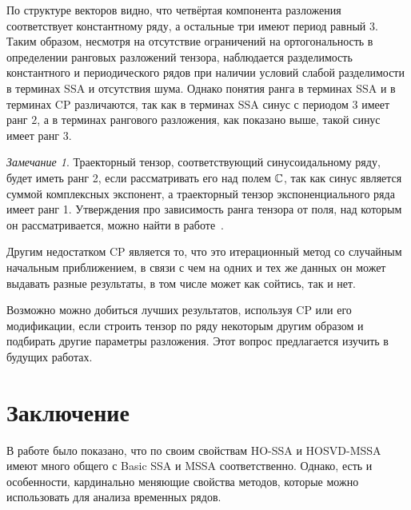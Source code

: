 \documentclass[specialist,
    substylefile = spbu.rtx,
    subf,href,colorlinks=true, 12pt]{disser}
\theoremstyle{plain}
\theoremstyle{definition}
\theoremstyle{remark}
\newtheorem*{remark}{Замечание}
\begin{document}
    По структуре векторов видно, что четвёртая компонента разложения соответствует константному ряду, а остальные три имеют период равный $3$.
    Таким образом, несмотря на отсутствие ограничений на ортогональность в определении ранговых разложений тензора, наблюдается
    разделимость константного и периодического рядов при наличии условий слабой разделимости в терминах SSA и отсутствия
    шума.
    Однако понятия ранга в терминах SSA и в терминах CP различаются, так как в терминах SSA синус с периодом $3$ имеет ранг $2$, а в
    терминах рангового разложения, как показано выше, такой синус имеет ранг $3$.
    \begin{remark}
        Траекторный тензор, соответствующий синусоидальному ряду, будет иметь ранг 2, если рассматривать его
        над полем $\mathbb{C}$, так как синус является суммой комплексных экспонент, а траекторный тензор экспоненциального
        ряда имеет ранг 1.
        Утверждения про зависимость ранга тензора от поля, над которым он рассматривается, можно найти в
        работе~\cite{tensor-bg}.
    \end{remark}

    Другим недостатком CP является то, что это итерационный метод со случайным начальным приближением, в связи
    с чем на одних и тех же данных он может выдавать разные результаты, в том числе может как сойтись, так и нет.

    Возможно можно добиться лучших результатов, используя CP или его модификации, если строить тензор по ряду
    некоторым другим образом и подбирать другие параметры разложения.
    Этот вопрос предлагается изучить в будущих работах.
    \newpage


    \section{Заключение}\label{sec:conclusion}
    В работе было показано, что по своим свойствам HO-SSA и HOSVD-MSSA имеют много общего
    с Basic SSA и MSSA соответственно.
    Однако, есть и особенности, кардинально меняющие свойства методов, которые можно использовать для анализа временных рядов.
\end{document}
